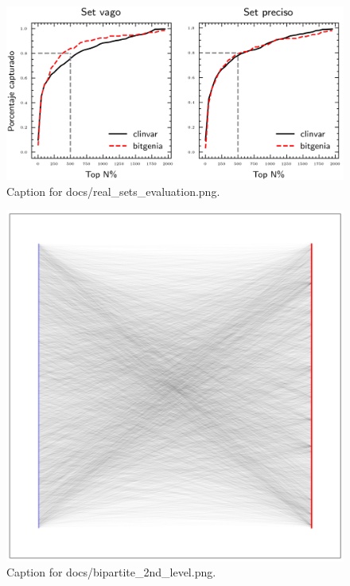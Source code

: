 \documentclass{article}
\begin{document}
\begin{figure}[h] \centering \includegraphics{docs/real_sets_evaluation.png} \caption{Caption for docs/real_sets_evaluation.png.} \end{figure}
\begin{figure}[h] \centering \includegraphics{docs/bipartite_2nd_level.png} \caption{Caption for docs/bipartite_2nd_level.png.} \end{figure}
\end{document}
